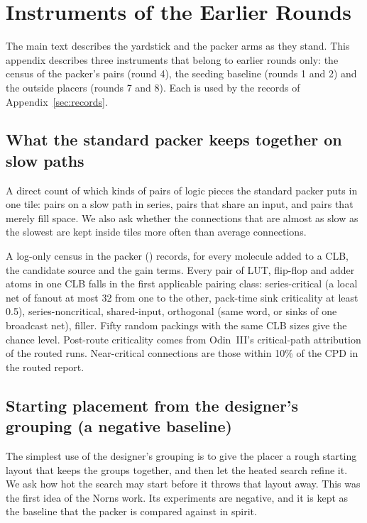 \appendices
\section{Instruments of the Earlier Rounds}
\label{sec:a-instruments}

The main text describes the yardstick and the packer arms as they stand. This appendix describes three instruments that belong to earlier rounds only: the census of the packer's pairs (round 4), the seeding baseline (rounds 1 and 2) and the outside placers (rounds 7 and 8). Each is used by the records of Appendix~\ref{sec:records}.

\subsection{What the standard packer keeps together on slow paths}
\label{sec:i-census}

 A direct count of which kinds of pairs of logic pieces the standard packer puts in one tile: pairs on a slow path in series, pairs that share an input, and pairs that merely fill space. We also ask whether the connections that are almost as slow as the slowest are kept inside tiles more often than average connections.

 A log-only census in the packer () records, for every molecule added to a CLB, the candidate source and the gain terms. Every pair of LUT, flip-flop and adder atoms in one CLB falls in the first applicable pairing class: series-critical (a local net of fanout at most 32 from one to the other, pack-time sink criticality at least 0.5), series-noncritical, shared-input, orthogonal (same word, or sinks of one broadcast net), filler. Fifty random packings with the same CLB sizes give the chance level. Post-route criticality comes from Odin~III's critical-path attribution of the routed runs. Near-critical connections are those within 10\% of the CPD in the routed report.

\subsection{Starting placement from the designer's grouping (a negative baseline)}
\label{sec:i-seed}

 The simplest use of the designer's grouping is to give the placer a rough starting layout that keeps the groups together, and then let the heated search refine it. We ask how hot the search may start before it throws that layout away. This was the first idea of the Norns work. Its experiments are negative, and it is kept as the baseline that the packer is compared against in spirit.

